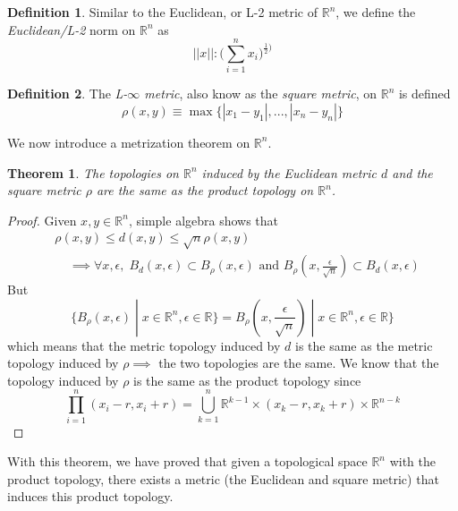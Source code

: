\documentclass{article}
\newtheorem{theorem}{Theorem}[section]
\theoremstyle{remark}
\theoremstyle{definition}
\newtheorem{definition}{Definition}[section]
\begin{document}
\begin{definition}
Similar to the Euclidean, or L-2 metric of $\mathbb{R}^n$, we define the \textit{Euclidean/L-2} norm on $\mathbb{R}^n$ as
\[||x||: \bigg( \sum_{i=1}^n x_i \bigg)^{\frac{1}{2})}\]
\end{definition}

\begin{definition}
The \textit{L-$\infty$ metric}, also know as the \textit{square metric}, on $\mathbb{R}^n$ is defined 
\[\rho(x, y) \equiv \max{\{|x_1 - y_1|, ..., |x_n - y_n|\}}\]
\end{definition}

We now introduce a metrization theorem on $\mathbb{R}^n$. 

\begin{theorem}
The topologies on $\mathbb{R}^n$ induced by the Euclidean metric $d$ and the square metric $\rho$ are the same as the product topology on $\mathbb{R}^n$. 
\end{theorem}
\begin{proof}
Given $x, y \in \mathbb{R}^n$, simple algebra shows that 
\begin{align*}
    & \rho(x, y) \leq d(x, y) \leq \sqrt{n} \rho(x, y) \\
    & \;\;\;\; \implies \forall x, \epsilon, \; B_d (x, \epsilon) \subset B_\rho (x, \epsilon) \text{ and } B_\rho (x, \frac{\epsilon}{\sqrt{n}}) \subset B_d (x, \epsilon)
\end{align*}
But
\[\{ B_\rho (x, \epsilon) \; | \; x \in \mathbb{R}^n, \epsilon \in \mathbb{R}\} = B_\rho (x, \frac{\epsilon}{\sqrt{n}}) \; | \; x \in \mathbb{R}^n, \epsilon \in \mathbb{R}\}\]
which means that the metric topology induced by $d$ is the same as the metric topology induced by $\rho \implies$ the two topologies are the same. We know that the topology induced by $\rho$ is the same as the product topology since 
\[\prod_{i=1}^n (x_i - r, x_i + r) = \bigcup_{k=1}^n \mathbb{R}^{k-1} \times (x_k - r, x_k + r) \times \mathbb{R}^{n-k}\]
\end{proof}
With this theorem, we have proved that given a topological space $\mathbb{R}^n$ with the product topology, there exists a metric (the Euclidean and square metric) that induces this product topology. 
\end{document}
